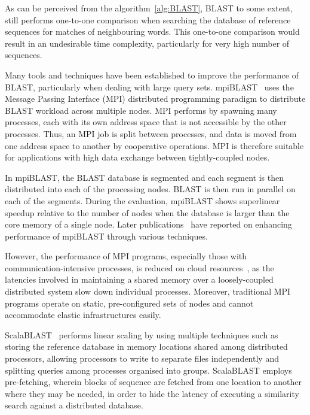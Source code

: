 \documentclass[titlepage]{csetr}
\begin{document}
As can be perceived from the algorithm~\ref{alg:BLAST}, BLAST to some extent, still performs one-to-one comparison when searching the database of reference sequences for matches of neighbouring words. This one-to-one comparison would result in an undesirable time complexity, particularly for very high number of sequences. 



Many tools and techniques have been established to improve the performance of BLAST, particularly when dealing with large query sets.  mpiBLAST~\cite{MPIBLAST} uses the Message Passing Interface (MPI) distributed programming paradigm to distribute BLAST workload across multiple nodes. MPI performs by spawning many processes, each with its own address space that is not accessible by the other processes. Thus, an MPI job is split between processes, and data is moved from one address space to another by cooperative operations.  MPI is therefore suitable for applications with high data exchange between tightly-coupled nodes.

In mpiBLAST, the BLAST database is segmented and each segment is then distributed into each of the processing nodes. BLAST is then run in parallel on each of the segments. During the evaluation, mpiBLAST shows superlinear speedup relative to the number of nodes when the database is larger than the core memory of a single node. Later publications~\cite{meng_high-performance_2010, lin_coordinating_2011} have reported on enhancing performance of mpiBLAST through various techniques.

However, the performance of MPI programs, especially those with communication-intensive processes, is reduced  on cloud resources~\cite{jackson_performance_2010}, as the latencies involved in maintaining a shared memory over a loosely-coupled distributed system slow down individual processes. Moreover, traditional MPI programs operate on static, pre-configured sets of nodes and cannot accommodate elastic infrastructures easily.

ScalaBLAST~\cite{oehmen_scalablast_2006} performs linear scaling by using multiple techniques such as storing the reference database in memory locations shared among distributed processors, allowing processors to write to separate files independently and splitting queries among processes organised into groups. ScalaBLAST employs pre-fetching, wherein blocks of sequence are fetched from one location to another where they may be needed, in order to hide the latency of executing a similarity search against a distributed database. 
\end{document}
